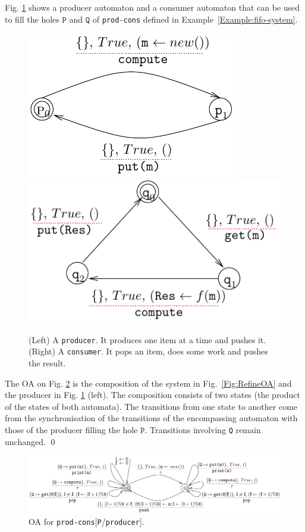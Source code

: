 \documentclass[runningheads]{llncs}
\begin{document}
\begin{example} \label{Example:prodandcons} Fig. \ref{Fig:procandcons} shows a producer automaton  and a consumer  automaton that can be used  to fill the holes $\texttt{P}$ and $\texttt{Q}$ of \texttt{prod-cons} defined in Example~\ref{Example:fifo-system}.
 \begin{figure}[!b]
 \centering
   \includegraphics[width=.35\textwidth]{Figures/P-proc.pdf}\hfill 
   \includegraphics[width=.45\textwidth]{Figures/Q-proc.pdf}
   \caption{(Left) A \texttt{producer}.  It produces one item at a time and pushes it.  (Right)  A \texttt{consumer}. It pops an item, does some work and pushes the result. \label{Fig:procandcons}}
\end{figure}



The OA on Fig. \ref{Fig:ComposeOA} is the composition of the system in Fig.~\ref{Fig:RefineOA} and the producer in Fig. \ref{Fig:procandcons} (left). The composition consists of two states (the product of the states of both automata). The transitions from one state to another come from  the synchronisation  of the transitions of the encompassing automaton with those of the producer filling the hole $\texttt{P}$. Transitions involving \texttt{Q} remain unchanged. \qed


\begin{figure}[!b]
 \centering
   \includegraphics[width=.99\textwidth]{Figures/compos-FIFO-Pro.pdf}
   \caption{OA for \texttt{prod-cons}[\texttt{P}/\texttt{producer}]. 
   \label{Fig:ComposeOA}} 
\end{figure}
\end{example}
\end{document}
